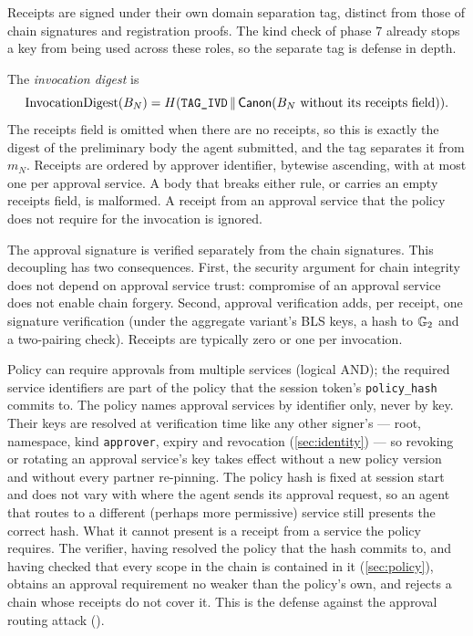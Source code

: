 \documentclass[11pt,a4paper]{article}
\begin{document}
Receipts are signed under their own domain separation tag, distinct
from those of chain signatures and registration proofs. The kind check
of phase 7 already stops a key from being used across these roles, so
the separate tag is defense in depth.

The \emph{invocation digest} is
\[
\mathrm{InvocationDigest}(B_N) =
  H(\texttt{TAG\_IVD} \,\|\, \mathsf{Canon}(B_N \text{ without its receipts field})).
\]
The receipts field is omitted when there are no receipts, so this is
exactly the digest of the preliminary body the agent submitted, and the
tag separates it from $m_N$. Receipts are ordered by approver
identifier, bytewise ascending, with at most one per approval service.
A body that breaks either rule, or carries an empty receipts field, is
malformed. A receipt from an approval service that the policy does not
require for the invocation is ignored.

The approval signature is verified separately from the chain
signatures. This decoupling has two consequences. First, the security
argument for chain integrity does not depend on approval service trust:
compromise of an approval service does not enable chain forgery. Second,
approval verification adds, per receipt, one signature verification
(under the aggregate variant's BLS keys, a hash to $\mathbb{G}_{2}$ and a
two-pairing check). Receipts are typically zero or one per
invocation.

Policy can require approvals from multiple services (logical AND); the
required service identifiers are part of the policy that the session
token's \texttt{policy\_hash} commits to. The policy names approval
services by identifier only, never by key. Their keys are resolved at
verification time like any other signer's --- root, namespace, kind
\texttt{approver}, expiry and revocation (\cref{sec:identity}) --- so
revoking or rotating an approval service's key takes effect without a
new policy version and without every partner re-pinning. The policy
hash is fixed at session start and does not vary with where the agent
sends its approval request, so an agent that routes to a different
(perhaps more permissive) service still presents the correct hash. What
it cannot present is a receipt from a service the policy requires. The
verifier, having resolved the policy that the hash commits to, and
having checked that every scope in the chain is contained in it
(\cref{sec:policy}), obtains an approval requirement no weaker than the
policy's own, and rejects a chain whose receipts do not cover it. This
is the defense against the approval routing attack ().
\end{document}
